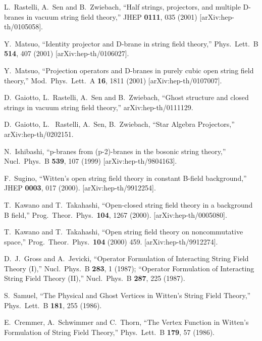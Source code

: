 \documentclass[a4paper,12pt]{article}
\begin{document}
\begin{thebibliography}{999}
L.~Rastelli, A.~Sen and B.~Zwiebach,
``Half strings, projectors, and multiple D-branes in 
vacuum string field  theory,''
JHEP {\bf 0111}, 035 (2001)
[arXiv:hep-th/0105058].


Y.~Matsuo,
``Identity projector and D-brane in string field theory,''
Phys.\ Lett.\ B {\bf 514}, 407 (2001)
[arXiv:hep-th/0106027].

Y.~Matsuo,
``Projection operators and D-branes 
in purely cubic open string field  theory,''
Mod.\ Phys.\ Lett.\ A {\bf 16}, 1811 (2001)
[arXiv:hep-th/0107007].

D.~Gaiotto, L.~Rastelli, A.~Sen and B.~Zwiebach,
``Ghost structure and closed strings in vacuum string field theory,''
arXiv:hep-th/0111129.

D.~Gaiotto, L.~ Rastelli, A.~Sen, B.~Zwiebach,
``Star Algebra Projectors,''
arXiv:hep-th/0202151.

N.~Ishibashi,
``p-branes from (p-2)-branes in the bosonic string theory,''
Nucl.\ Phys.\ B {\bf 539}, 107 (1999)
[arXiv:hep-th/9804163].

F.~Sugino,
``Witten's open string field theory 
in constant B-field background,''
JHEP {\bf 0003}, 017 (2000).
[arXiv:hep-th/9912254].

T.~Kawano and T.~Takahashi,
``Open-closed string field theory in a background B field,''
Prog.\ Theor.\ Phys.\  {\bf 104}, 1267 (2000).
[arXiv:hep-th/0005080].

T.~Kawano and T.~Takahashi,
``Open string field theory on noncommutative space,''
Prog.\ Theor.\ Phys.\  {\bf 104} (2000) 459.
[arXiv:hep-th/9912274].



D.~J.~Gross and A.~Jevicki,
``Operator Formulation of Interacting String Field Theory (I),''
Nucl.\ Phys.\ B {\bf 283}, 1 (1987);
``Operator Formulation of Interacting String Field Theory (II),''
Nucl.\ Phys.\ B {\bf 287}, 225 (1987).



S.~Samuel,
``The Physical and Ghost Vertices in Witten's String Field Theory,''
Phys.\ Lett.\ B {\bf 181}, 255 (1986).


E.~Cremmer, A.~Schwimmer and C.~Thorn,
``The Vertex Function in Witten's Formulation of String Field Theory,''
Phys.\ Lett.\ B {\bf 179}, 57 (1986).



\end{thebibliography}
\end{document}
